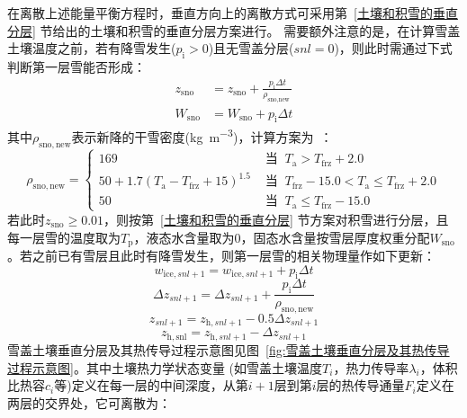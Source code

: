 在离散上述能量平衡方程时，垂直方向上的离散方式可采用第~\ref{土壤和积雪的垂直分层} 节给出的土壤和积雪的垂直分层方案进行。
需要额外注意的是，在计算雪盖土壤温度之前，若有降雪发生($p_{\mathrm {i}} >0$)且无雪盖分层($snl=0$)，则此时需通过下式判断第一层雪能否形成：
\begin{equation}
  \begin{aligned}
    z_{\mathrm{sno}} &= z_{\mathrm{sno}}+\frac{p_{\mathrm{i}} \Delta t}{\rho_{\text {sno,new }}} \\[1ex]
    W_{\mathrm{sno}} &= W_{\mathrm{sno}}+p_{\mathrm{i}} \Delta t
  \end{aligned}
\end{equation}
其中$\rho_{\mathrm{sno,new}}$表示新降的干雪密度(\unit{kg.m^{-3}})，计算方案为~\citep{anderson1976point}：
\begin{equation}
  \rho_{\mathrm{sno, new}}=\begin{cases}
    169 & \text { 当 }\ T_{\mathrm{a}}>T_{\mathrm{frz}}+2.0 \\
    50+1.7\left(T_{\mathrm{a}}-T_{\mathrm{frz}}+15\right)^{1.5}  & \text { 当 }\ T_{\mathrm{frz}}-15.0<T_{\mathrm{a}} \leqslant T_{\mathrm{frz}}+2.0 \\
    50 & \text { 当 }\ T_{\mathrm{a}} \leqslant T_{\mathrm{frz}}-15.0
  \end{cases}
\end{equation}
若此时$z_{\mathrm{sno}} \geqslant 0.01$，则按第~\ref{土壤和积雪的垂直分层} 节方案对积雪进行分层，且每一层雪的温度取为$T_{\mathrm {p}} $，液态水含量取为0，固态水含量按雪层厚度权重分配$W_{\mathrm{sno}}$。若之前已有雪层且此时有降雪发生，则第一层雪的相关物理量作如下更新：
\begin{equation}
  w_{\mathrm{ice},snl+1}=w_{\mathrm{ice},snl+1}+p_{\mathrm{i}} \Delta t
\end{equation}
\begin{equation}
  \Delta z_{snl+1}=\Delta z_{snl+1}+\frac{p_{\mathrm{i}} \Delta t}{\rho_{\mathrm{sno, new}}}
\end{equation}
\begin{equation}
  z_{snl+1}=z_{\mathrm{h},snl+1}-0.5 \Delta z_{snl+1}
\end{equation}
\begin{equation}
  z_{\mathrm{h, snl}}=z_{\mathrm{h},snl+1}-\Delta z_{snl+1}
\end{equation}
雪盖土壤垂直分层及其热传导过程示意图见图~\ref{fig:雪盖土壤垂直分层及其热传导过程示意图}。其中土壤热力学状态变量
(如雪盖土壤温度$T_{i} $，热力传导率$\lambda_i$，体积比热容$c_i$等)定义在每一层的中间深度，从第$i+1$层到第$i$层的热传导通量$F_i$定义在两层的交界处，它可离散为：
